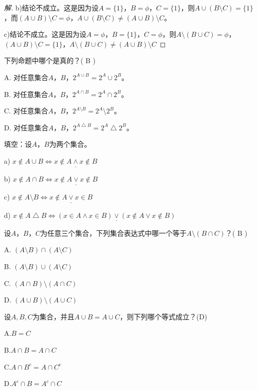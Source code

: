 \documentclass{article}
\begin{document}
\begin{CJK}{UTF8}{gbsn}
\begin{proof}[解]
  b)结论不成立。这是因为设$A=\{1\}$，$B=\phi$，$C=\{1\}$，则$A\cup(B\setminus C)=\{1\}$，而$(A\cup B)\setminus C=\phi$，$A\cup(B\setminus C) \neq (A\cup B)\setminus C$。

  c)结论不成立。这是因为设$A=\phi$，$B=\{1\}$，$C=\phi$，则$A\setminus (B\cup C)=\phi$，$(A\cup B)\setminus C=\{1\}$，$A\setminus (B\cup C) \neq (A\cup B)\setminus C$
\end{proof}
\begin{Exercise}
  下列命题中哪个是真的？(  B  )

A. 对任意集合$A$，$B$，$2^{A\cup B} = 2^A \cup 2^B$。

B. 对任意集合$A$，$B$，$2^{A\cap B} = 2^A \cap 2^B$。

C. 对任意集合$A$，$B$，$2^{A\setminus B} = 2^A \setminus 2^B$。

D. 对任意集合$A$，$B$，$2^{A\bigtriangleup B} = 2^A \bigtriangleup 2^B$。

\end{Exercise}
\begin{Exercise}
  填空：设$A$，$B$为两个集合。

  a) $x\notin A\cup B\Leftrightarrow \underline{x\notin A \land x\notin B}$

  b) $x\notin A\cap B\Leftrightarrow \underline{x\notin A \lor x\notin B}$

  c) $x\notin A\setminus B\Leftrightarrow \underline{x\notin A \lor x\in B}$

  d) $x\notin A\bigtriangleup B\Leftrightarrow \underline{(x\in A \land x\in B)\lor(x\notin A \lor x\notin B)}$
\end{Exercise}
\begin{Exercise}
  设$A$，$B$，$C$为任意三个集合，下列集合表达式中哪一个等于$A\setminus (B\cap C)$？( B  )

  A. $(A\setminus B)\cap (A\setminus C)$

  B. $(A\setminus B)\cup (A\setminus C)$

  C. $(A\cap B)\setminus (A\cap C)$

  D. $(A\cup B)\setminus (A\cup C)$
\end{Exercise}


\begin{Exercise}
  设$A,B,C$为集合，并且$A\cup B=A\cup C$，则下列哪个等式成立？(D)

  A.$B=C$

  B.$A\cap B = A\cap C$

  C.$A\cap B^c = A\cap C^c$

  D.$A^c\cap B = A^c\cap C$
\end{Exercise}




\end{CJK}
\end{document}
